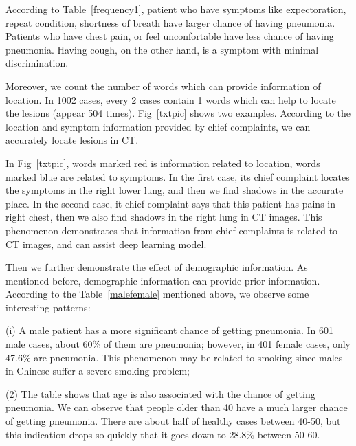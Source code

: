 \documentclass[journal]{IEEEtran}
\begin{document}
According to Table~\ref{frequency1}, patient who have symptoms like expectoration, repeat condition, shortness of breath have larger chance of having pneumonia. Patients who have chest pain, or feel unconfortable have less chance of having pneumonia. Having cough, on the other hand, is a symptom with minimal discrimination.

Moreover, we count the number of words which can provide information of location. In 1002 cases, every 2 cases contain 1 words which can help to locate the lesions (appear 504 times). 
Fig~\ref{txtpic} shows two examples. According to the location and symptom information provided by chief complaints, we can accurately locate lesions in CT. 

In Fig~\ref{txtpic}, words marked red is information related to location, words marked blue are related to symptoms. In the first case, its chief complaint locates the symptoms in the right lower lung, and then we find shadows in the accurate place. In the second case, it chief complaint says that this patient has pains in right chest, then we also find shadows in the right lung in CT images.
This phenomenon demonstrates that information from chief complaints is related to CT images, and can assist deep learning model.    

Then we further demonstrate the effect of demographic information. As mentioned before, demographic information can provide prior information. According to the Table~\ref{malefemale} mentioned above, we observe some interesting patterns:

(i) A male patient has a more significant chance of getting pneumonia. In 601 male cases, about 60\% of them are pneumonia; however, in 401 female cases, only 47.6\% are pneumonia. This phenomenon may be related to smoking since males in Chinese suffer a severe smoking problem; 

(2) The table shows that age is also associated with the chance of getting pneumonia. We can observe that people older than 40 have a much larger chance of getting pneumonia. There are about half of healthy cases between 40-50, but this indication drops so quickly that it goes down to 28.8\% between 50-60. 
\end{document}

